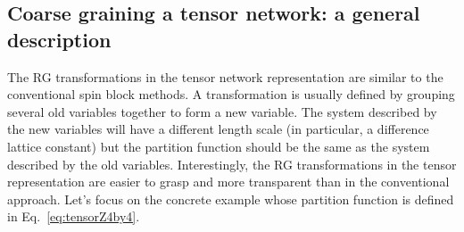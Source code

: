 \documentclass[aps,prb,reprint,superscriptaddress]{revtex4-2}
\begin{document}
\subsection{Coarse graining a tensor network: a general
description\label{cgTN}}
The RG transformations in the tensor network representation are similar
to the conventional spin block methods. A transformation is usually
defined by grouping several old variables together to form a new
variable. The system described by the new variables will have a
different length scale (in particular, a difference lattice constant)
but the partition function should be the same as the system described by
the old variables. Interestingly, the RG transformations in the tensor
representation are easier to grasp and more transparent than in the
conventional approach. Let's focus on the concrete example whose
partition function is defined in Eq.~\eqref{eq:tensorZ4by4}. 
%
\end{document}
